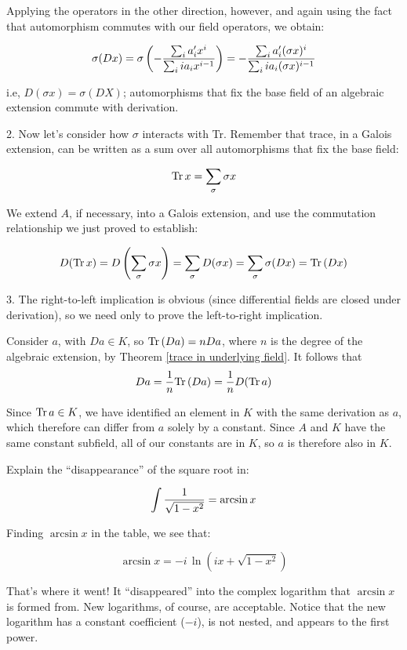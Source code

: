 Applying the operators in the other direction, however, and again using
the fact that automorphism commutes with our field operators, we obtain:

$$\sigma(D x) = \sigma\left(- {\sum_i a_i' x^i \over {\sum_i i a_i x^{i-1}}} \right)
= - {\sum_i a_i' (\sigma x)^i \over {\sum_i i a_i (\sigma x)^{i-1}}} $$

i.e, $D(\sigma x) = \sigma(D X)$; automorphisms that fix the base field
of an algebraic extension commute with derivation.

2. Now let's consider how $\sigma$ interacts with Tr.  Remember that
trace, in a Galois extension, can be written as a sum over all
automorphisms that fix the base field:

$${\rm Tr\,} x = \sum_\sigma \sigma x$$

We extend $A$, if necessary, into a Galois extension, and use
the commutation relationship we just proved to establish:

$$D({\rm Tr\,} x) = D\left(\sum_\sigma \sigma x\right) = \sum_\sigma D(\sigma x)
= \sum_\sigma \sigma(D x) = {\rm Tr\,}(D x)$$

3. The right-to-left implication is obvious (since differential fields
are closed under derivation), so we need only to prove the
left-to-right implication.

Consider $a$, with $D a \in K$,
so ${\rm Tr\,}(D a) = n D a$, where $n$ is the degree of the algebraic extension,
by Theorem \ref{trace in underlying field}.
It follows that
$$D a = \frac{1}{n} {\rm Tr\,}(D a) = \frac{1}{n} D({\rm Tr\,} a)$$

Since ${\rm Tr\,} a \in K$, we have identified an
element in $K$ with the same derivation as $a$, which therefore can
differ from $a$ solely by a constant.  Since $A$ and $K$ have the same
constant subfield, all of our constants are in $K$, so $a$ is
therefore also in $K$.

\endtheorem

\example

Explain the ``disappearance'' of the square root in:

$$\int{1\over\sqrt{1-x^2}} = \arcsin x$$

Finding $\arcsin x$ in the table, we see that:

$$\arcsin x = -i \,\ln (ix + \sqrt{1-x^2})$$

That's where it went!  It ``disappeared'' into the complex logarithm
that $\arcsin x$ is formed from.  New logarithms, of course, are
acceptable.  Notice that the new logarithm has a constant coefficient
($-i$), is not nested, and appears to the first power.


